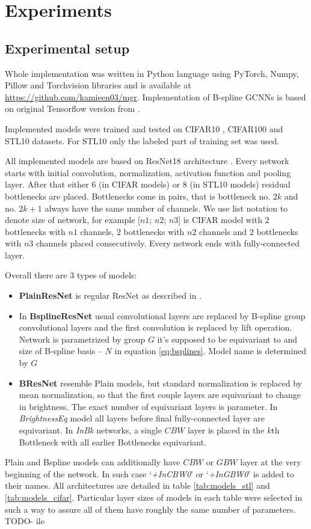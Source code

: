 \section{Experiments}
\subsection{Experimental setup}
Whole implementation was written in Python language using
PyTorch, Numpy, Pillow and Torchvision libraries
and is available at
\url{https://github.com/kamieen03/mgr}.
Implementation
of B-spline GCNNs is based on original Tensorflow version from
\cite{bekkers2019}.

Implemented models were trained and tested on CIFAR10 \cite{cifar},
CIFAR100 \cite{cifar} and STL10 \cite{stl10} datasets.
For STL10 only the labeled part of training set was used.

All implemented models are based on ResNet18 architecture \cite{resnet}.
Every network starts with initial convolution, normalization, activation
function and pooling layer. After that either $6$ (in CIFAR models)
or $8$ (in STL10 models) residual bottlenecks are
placed. Bottlenecks come in pairs, that is bottleneck no. $2k$ and no. $2k+1$
always have the same number of channels. We use list notation to denote size of
network, for example [$\mathit{n1}$; $\mathit{n2}$; $\mathit{n3}$]
is CIFAR model with $2$ bottlenecks with $n1$ channels, $2$ bottlenecks with
$n2$ channels and $2$ bottlenecks with $n3$ channels placed consecutively.
Every network ends with
fully-connected layer.

Overall there are 3 types of models:
\begin{itemize}
    \item \textbf{PlainResNet} is regular ResNet as described in \cite{resnet}.
    \item In \textbf{BsplineResNet} usual convolutional layers are replaced by
        B-spline group convolutional layers and the first convolution is replaced
        by lift operation. Network is parametrized by group $G$ it's supposed to be
        equivariant to and size of B-spline basis -- $N$ in equation
        \ref{eq:bsplines}. Model name is determined by $G$
    \item \textbf{BResNet} resemble Plain models, but standard normalization is
        replaced by mean normalization, so that the first couple layers are
        equivariant to change in brightness. The exact number of equivariant
        layers is parameter. In \textit{BrightnessEq} model all layers before
        final fully-connected layer are equivariant. In \textit{InBk} networks,
        a single $CBW$ layer is placed in the $k$th Bottleneck with all earlier
        Bottlenecks equivariant.
\end{itemize}
Plain and Bspline models can additionally have $\mathit{CBW}$ or $\mathit{GBW}$
layer at the very beginning of the network. In such case `\textit{+InCBW0}' or
`\textit{+InGBW0}' is added to their names. All architectures are detailed in
table \ref{tab:models_stl} and \ref{tab:models_cifar}. Particular layer sizes of
models in each table were selected in such a way to assure all of them have
roughly the same number of parameters. TODO- ile

